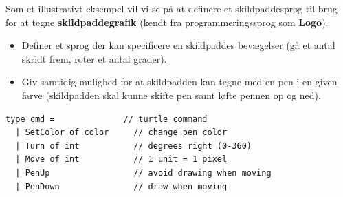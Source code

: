 \documentclass[rgb]{beamer}
\begin{document}
\begin{frame}[fragile]
\begin{footnotesize}

  \vspace{1ex}

  Som et illustrativt eksempel vil vi se på at definere et
  skildpaddesprog til brug for at tegne \textbf{skildpaddegrafik} (kendt fra
  programmeringssprog som \textbf{Logo}).

  \vspace{1ex}

  \begin{itemize}
  \item Definer et sprog der kan specificere en skildpaddes bevægelser (gå et antal skridt frem, roter et antal grader).
  \item Giv samtidig mulighed for at skildpadden kan tegne med en pen
    i en given farve (skildpadden skal kunne skifte pen samt løfte
    pennen op og ned).
  \end{itemize}


\begin{lstlisting}[numbers=none,frame=none,mathescape]
type cmd =              // turtle command
  | SetColor of color     // change pen color
  | Turn of int           // degrees right (0-360)
  | Move of int           // 1 unit = 1 pixel
  | PenUp                 // avoid drawing when moving
  | PenDown               // draw when moving
\end{lstlisting}

\end{footnotesize}
\end{frame}
\end{document}
